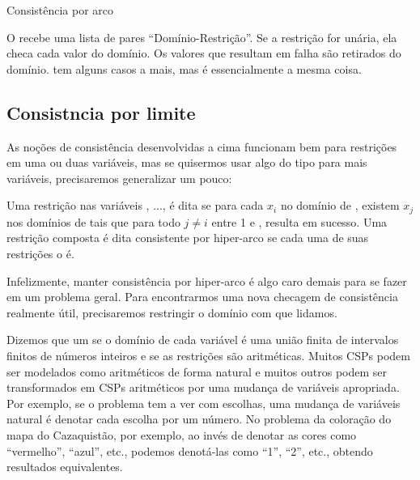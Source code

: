 \documentclass{article}
\begin{document}
\begin{listing}[H]
  \inputminted{prolog}{../Exemplos/Cap9/arc_consistency.pl}\label{lst:arc_consistency}
  \caption{Consistência por arco}
\end{listing}

O  recebe uma lista de pares
``Domínio-Restrição''. Se a restrição for unária, ela checa cada valor
do domínio.  Os valores que resultam em falha são retirados do
domínio.  tem alguns casos a mais,
mas é essencialmente a mesma coisa.

\subsection{Consistncia por limite}

As noções de consistência desenvolvidas a cima funcionam bem para
restrições em uma ou duas variáveis, mas se quisermos usar algo do
tipo para mais variáveis, precisaremos generalizar um pouco:

\begin{definition}
  Uma restrição  nas variáveis , ...,
   é dita  se para
  cada $x_i$ no domínio de , existem $x_j$ nos domínios de
   tais que para todo $j \neq i$ entre 1 e ,
   resulta em sucesso. Uma
  restrição composta é dita consistente por hiper-arco se cada uma de
  suas restrições o é.
\end{definition}

Infelizmente, manter consistência por hiper-arco é algo caro demais
para se fazer em um problema geral. Para encontrarmos uma nova
checagem de consistência realmente útil, precisaremos restringir o
domínio com que lidamos.

Dizemos que um  se o domínio de cada
variável é uma união finita de intervalos finitos de números inteiros
e se as restrições são aritméticas. Muitos CSPs podem ser modelados
como aritméticos de forma natural e muitos outros podem ser
transformados em CSPs aritméticos por uma mudança de variáveis
apropriada.  Por exemplo, se o problema tem a ver com escolhas, uma
mudança de variáveis natural é denotar cada escolha por um número. No
problema da coloração do mapa do Cazaquistão, por exemplo, ao invés de
denotar as cores como ``vermelho'', ``azul'', etc., podemos denotá-las
como ``1'', ``2'', etc., obtendo resultados equivalentes.
\end{document}
